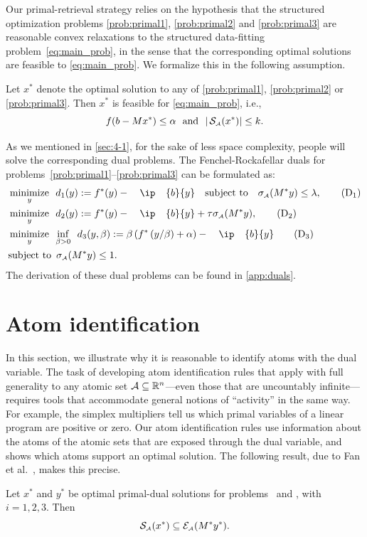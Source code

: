 Our primal-retrieval strategy relies on the hypothesis that the structured optimization problems \eqref{prob:primal1}, \eqref{prob:primal2} and \eqref{prob:primal3} are reasonable convex relaxations to the structured data-fitting problem~\eqref{eq:main_prob}, in the sense that the corresponding optimal solutions are feasible to \eqref{eq:main_prob}. We formalize this in the following assumption.

\begin{assumption} \label{ass:blanket}
    Let $x^*$ denote the optimal solution to any of \eqref{prob:primal1}, \eqref{prob:primal2} or \eqref{prob:primal3}. Then $x^*$ is feasible for \eqref{eq:main_prob}, i.e., 
    \[f(b - Mx^*) \leq \alpha \enspace\mathop{\hbox{\rm and}}\enspace |\operatorname{\mathcal{S}_{\scriptscriptstyle\mathcal{A}}}(x^*)| \leq k.\]
\end{assumption}

As we mentioned in \autoref{sec:4-1}, for the sake of less space complexity, people will solve the corresponding dual problems. The Fenchel-Rockafellar duals for problems~\eqref{prob:primal1}--\eqref{prob:primal3} can be formulated as:
\begin{align} 
  & \minimize{y}  d_1(y) := f^*(y) - \ip{b}{y} \text{subject to} \sigma\As(M^*y) \leq \lambda, \label{prob:dual1} \tag{D$_1$}\\
  & \minimize{y} d_2(y) := f^*(y) - \ip{b}{y} + \tau\sigma\As(M^*y), \label{prob:dual2} \tag{D$_2$}\\
  & \minimize{y} \inf_{\beta > 0} \enspace d_3(y, \beta)
    := \beta \left(
      f^*\left( y/\beta \right) + \alpha
    \right) - \ip{b}{y} \label{prob:dual3} \tag{D$_3$}\\
  & \mbox{subject to}\enspace \sigma\As(M^* y) \leq 1. \nonumber
\end{align}
The derivation of these dual problems can be found in \autoref{app:duals}. 

\section{Atom identification} \label{sec:atom_iden}

In this section, we illustrate why it is reasonable to identify atoms with the dual variable. The task of developing atom identification rules that apply with full generality to any atomic set $\mathcal{A}\subseteq\mathbb{R}^n$---even those that are uncountably infinite---requires tools that accommodate general notions of ``activity'' in
the same way. For example, the simplex multipliers tell us which primal
variables of a linear program are positive or zero. Our atom identification rules use information about the atoms of the atomic sets that are exposed through the dual variable, and shows which atoms support an optimal solution. The following
result, due to Fan et al.~\cite[Proposition~4.5 and Theorem~5.1]{fan2019alignment}, makes this precise.
\begin{theorem}\label{thm:opt_supp_id} Let
  $x^*$ and $ y^*$ be optimal primal-dual solutions for problems \Probi~and \Drobi, with
  $i=1,2,3$. Then
  \[\operatorname{\mathcal{S}_{\scriptscriptstyle\mathcal{A}}}(x^*) \subseteq \mathcal{E}_{\scriptscriptstyle\mathcal{A}}(M^*y^*). \]
\end{theorem}

